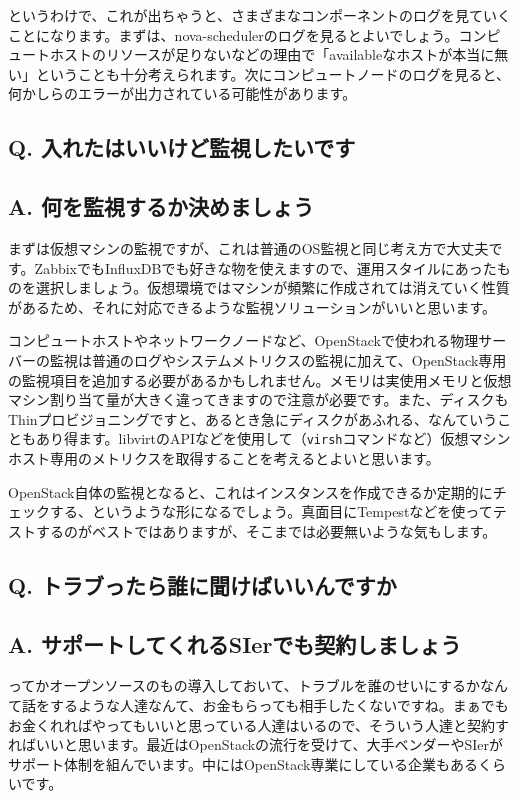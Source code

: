 \documentclass[9pt,b5paper,tombo,openany]{jsbook}
\begin{document}
というわけで、これが出ちゃうと、さまざまなコンポーネントのログを見ていくことになります。まずは、nova-schedulerのログを見るとよいでしょう。コンピュートホストのリソースが足りないなどの理由で「availableなホストが本当に無い」ということも十分考えられます。次にコンピュートノードのログを見ると、何かしらのエラーが出力されている可能性があります。

\subsection*{{\LARGE\bfseries Q.} 入れたはいいけど監視したいです}
\subsection*{{\LARGE\bfseries A.} 何を監視するか決めましょう}
まずは仮想マシンの監視ですが、これは普通のOS監視と同じ考え方で大丈夫です。ZabbixでもInfluxDBでも好きな物を使えますので、運用スタイルにあったものを選択しましょう。仮想環境ではマシンが頻繁に作成されては消えていく性質があるため、それに対応できるような監視ソリューションがいいと思います。

コンピュートホストやネットワークノードなど、OpenStackで使われる物理サーバーの監視は普通のログやシステムメトリクスの監視に加えて、OpenStack専用の監視項目を追加する必要があるかもしれません。メモリは実使用メモリと仮想マシン割り当て量が大きく違ってきますので注意が必要です。また、ディスクもThinプロビジョニングですと、あるとき急にディスクがあふれる、なんていうこともあり得ます。libvirtのAPIなどを使用して（\verb|virsh|コマンドなど）仮想マシンホスト専用のメトリクスを取得することを考えるとよいと思います。

OpenStack自体の監視となると、これはインスタンスを作成できるか定期的にチェックする、というような形になるでしょう。真面目にTempestなどを使ってテストするのがベストではありますが、そこまでは必要無いような気もします。

\subsection*{{\LARGE\bfseries Q.} トラブったら誰に聞けばいいんですか}
\subsection*{{\LARGE\bfseries A.} サポートしてくれるSIerでも契約しましょう}
ってかオープンソースのもの導入しておいて、トラブルを誰のせいにするかなんて話をするような人達なんて、お金もらっても相手したくないですね。まぁでもお金くれればやってもいいと思っている人達はいるので、そういう人達と契約すればいいと思います。最近はOpenStackの流行を受けて、大手ベンダーやSIerがサポート体制を組んでいます。中にはOpenStack専業にしている企業もあるくらいです。
\end{document}
